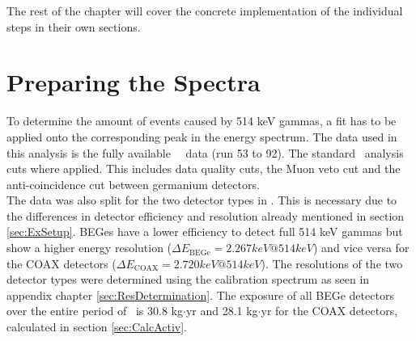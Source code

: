 \documentclass[encoding=utf8,british]{tumphthesis}
\begin{document}
The rest of the chapter will cover the concrete implementation of the individual steps in their own sections.
\\
\fi
\section{Preparing the Spectra}
\label{sec:prep}

To determine the amount of events caused by 514 keV gammas, a fit has to be applied onto the corresponding peak in the energy spectrum.
The data used in this analysis is the fully available \gerda\ \PII\ data (run 53 to 92).
The standard \gerda\ analysis cuts where applied.
This includes data quality cuts, the Muon veto cut and the anti-coincidence cut between germanium detectors.
\\

The data was also split for the two detector types in \gerda.
This is necessary due to the differences in detector efficiency and resolution already mentioned in section \ref{sec:ExSetup}.
BEGes have a lower efficiency to detect full 514 keV gammas but show a higher energy resolution ($\Delta E_{\mathrm{BEGe}} = 2.267\unit{keV}  @ 514 \unit{keV}$) and vice versa for the COAX detectors ($\Delta E_{\mathrm{COAX}} = 2.720\unit{keV} @ 514 \unit{keV}$).
The resolutions of the two detector types were determined using the calibration spectrum as seen in appendix chapter \ref{sec:ResDetermination}.
The exposure of all BEGe detectors over the entire period of \PII\ is 30.8 kg$\cdot$yr and 28.1 kg$\cdot$yr for the COAX detectors, calculated in section \ref{sec:CalcActiv}.
\\
\end{document}
